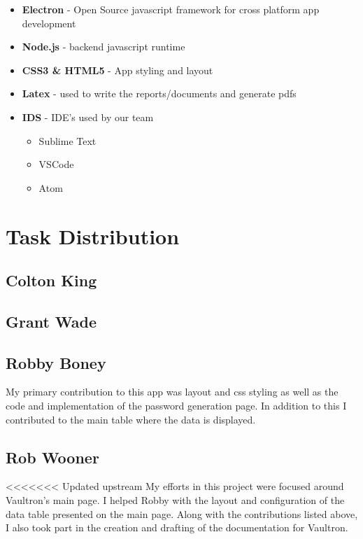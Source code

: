 \documentclass[11pt]{report}
\begin{document}
\begin{itemize}
    \item \textbf{Electron} - Open Source javascript framework for cross platform app development
    \item \textbf{Node.js} - backend javascript runtime
    \item \textbf{CSS3 \& HTML5} - App styling and layout
    \item \textbf{Latex} - used to write the reports/documents and generate pdfs
    \item \textbf{IDS} - IDE's used by our team 
        \begin{itemize}
            \item Sublime Text
            \item VSCode
            \item Atom
        \end{itemize}
\end{itemize}


\section{Task Distribution}

\subsection{Colton King}

\subsection{Grant Wade}

\subsection{Robby Boney}
My primary contribution to this app was layout and css styling as well as the 
code and implementation of the password generation page. In addition to this
I contributed to the main table where the data is displayed.

\subsection{Rob Wooner}
<<<<<<< Updated upstream
My efforts in this project were focused around Vaultron's main page. I helped
Robby with the layout and configuration of the data table presented on the main
page. Along with the contributions listed above, I also took part in the creation 
and drafting of the documentation for Vaultron.
\end{document}
